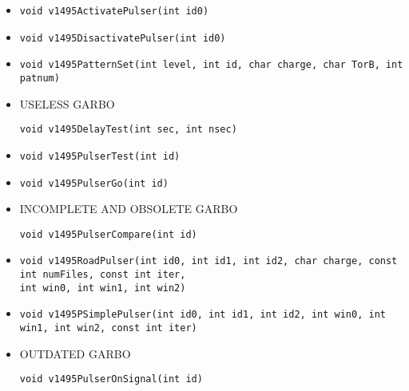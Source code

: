 \documentclass[11pt]{article}
\begin{document}
\begin{itemize}
		\item
			\begin{lstlisting}
void v1495ActivatePulser(int id0)			
			\end{lstlisting}

		\item
			\begin{lstlisting}
void v1495DisactivatePulser(int id0)			
			\end{lstlisting}
			
		\item
			\begin{lstlisting}
void v1495PatternSet(int level, int id, char charge, char TorB, int patnum)			
			\end{lstlisting}			

		\item USELESS GARBO
			\begin{lstlisting}
void v1495DelayTest(int sec, int nsec)			
			\end{lstlisting}

		\item
			\begin{lstlisting}
void v1495PulserTest(int id)
			\end{lstlisting}

		\item
			\begin{lstlisting}
void v1495PulserGo(int id)			
			\end{lstlisting}

		\item INCOMPLETE AND OBSOLETE GARBO
			\begin{lstlisting}
void v1495PulserCompare(int id)			
			\end{lstlisting}

		\item
			\begin{lstlisting}
void v1495RoadPulser(int id0, int id1, int id2, char charge, const int numFiles, const int iter, 
int win0, int win1, int win2)		
			\end{lstlisting}

		\item
			\begin{lstlisting}
void v1495PSimplePulser(int id0, int id1, int id2, int win0, int win1, int win2, const int iter)			
			\end{lstlisting}

		\item OUTDATED GARBO
			\begin{lstlisting}
void v1495PulserOnSignal(int id)			
			\end{lstlisting}


\end{itemize}
\end{document}
